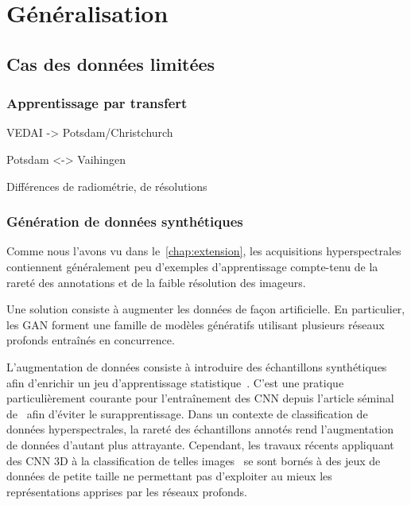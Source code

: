 \chapter{Généralisation}
\label{chap:generalisation}
\minitoc

\chapsummary{%

}

\newpage

\section{Cas des données limitées}

\subsection{Apprentissage par transfert}

VEDAI -> Potsdam/Christchurch

Potsdam <-> Vaihingen

Différences de radiométrie, de résolutions

\subsection{Génération de données synthétiques}

Comme nous l'avons vu dans le~\cref{chap:extension}, les acquisitions hyperspectrales contiennent généralement peu d'exemples d'apprentissage compte-tenu de la rareté des annotations et de la faible résolution des imageurs.

Une solution consiste à augmenter les données de façon artificielle. En particulier, les \gls{GAN} forment une famille de modèles génératifs utilisant plusieurs réseaux profonds entraînés en concurrence.

L'augmentation de données consiste à introduire des échantillons synthétiques afin d'enrichir un jeu d'apprentissage statistique~\cite{dyk_art_2012}. C'est une pratique particulièrement courante pour l'entraînement des \gls{CNN} depuis l'article séminal de~\citet{krizhevsky_imagenet_2012} afin d'éviter le surapprentissage. Dans un contexte de classification de données hyperspectrales, la rareté des échantillons annotés rend l'augmentation de données d'autant plus attrayante. Cependant, les travaux récents appliquant des \gls{CNN} 3D à la classification de telles images~\cite{chen_deep_2016,makantasis_deep_2015,slavkovikj_hyperspectral_2015,lee_contextual_2016} se sont bornés à des jeux de données de petite taille ne permettant pas d'exploiter au mieux les représentations apprises par les réseaux profonds.

